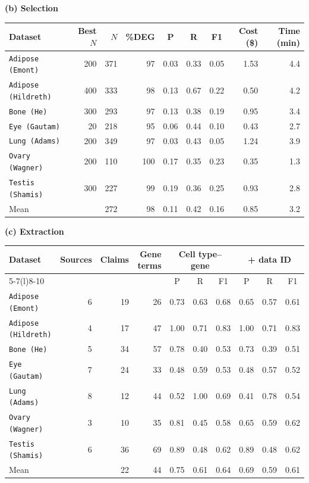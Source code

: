 \documentclass[10pt,twocolumn]{article}
\theoremstyle{plain}
\theoremstyle{definition}
\theoremstyle{remark}
\begin{document}
\begin{table}[ht!]
  \vspace{6pt}
  \textbf{(b) Selection}
  \vspace{2pt}

  \begin{tabular}{@{}l r r r ccc r r@{}}
  \toprule
  Dataset & Best $N$ & $N$ & \%DEG & P & R & F1 & Cost (\$) & Time (min) \\
  \midrule
  \texttt{Adipose (Emont)}    & 200 & 371 &  97 & 0.03 & 0.33 & 0.05 & 1.53 &  4.4 \\
  \texttt{Adipose (Hildreth)} & 400 & 333 &  98 & 0.13 & 0.67 & 0.22 & 0.50 &  4.2 \\
  \texttt{Bone (He)}          & 300 & 293 &  97 & 0.13 & 0.38 & 0.19 & 0.95 &  3.4 \\
  \texttt{Eye (Gautam)}       &  20 & 218 &  95 & 0.06 & 0.44 & 0.10 & 0.43 &  2.7 \\
  \texttt{Lung (Adams)}       & 200 & 349 &  97 & 0.03 & 0.43 & 0.05 & 1.24 &  3.9 \\
  \texttt{Ovary (Wagner)}     & 200 & 110 & 100 & 0.17 & 0.35 & 0.23 & 0.35 &  1.3 \\
  \texttt{Testis (Shamis)}    & 300 & 227 &  99 & 0.19 & 0.36 & 0.25 & 0.93 &  2.8 \\
  \midrule
  Mean               &     & 272 &  98 & 0.11 & 0.42 & 0.16 & 0.85 &  3.2 \\
  \bottomrule
  \end{tabular}

  \vspace{6pt}
  \textbf{(c) Extraction}
  \vspace{2pt}

  \begin{tabular}{@{}l r r r ccc ccc@{}}
  \toprule
  Dataset & Sources & Claims & Gene terms & \multicolumn{3}{c}{Cell type--gene} & \multicolumn{3}{c}{+ data ID} \\
  \cmidrule(lr){5-7}\cmidrule(l){8-10}
  & & & & P & R & F1 & P & R & F1 \\
  \midrule
  \texttt{Adipose (Emont)}    & 6 & 19 & 26 & 0.73 & 0.63 & 0.68 & 0.65 & 0.57 & 0.61 \\
  \texttt{Adipose (Hildreth)} & 4 & 17 & 47 & 1.00 & 0.71 & 0.83 & 1.00 & 0.71 & 0.83 \\
  \texttt{Bone (He)}          & 5 & 34 & 57 & 0.78 & 0.40 & 0.53 & 0.73 & 0.39 & 0.51 \\
  \texttt{Eye (Gautam)}       & 7 & 24 & 33 & 0.48 & 0.59 & 0.53 & 0.48 & 0.57 & 0.52 \\
  \texttt{Lung (Adams)}       & 8 & 12 & 44 & 0.52 & 1.00 & 0.69 & 0.41 & 0.78 & 0.54 \\
  \texttt{Ovary (Wagner)}     & 3 & 10 & 35 & 0.81 & 0.45 & 0.58 & 0.65 & 0.59 & 0.62 \\
  \texttt{Testis (Shamis)}    & 6 & 36 & 69 & 0.89 & 0.48 & 0.62 & 0.89 & 0.48 & 0.62 \\
  \midrule
  Mean                         &   & 22 & 44 & 0.75 & 0.61 & 0.64 & 0.69 & 0.59 & 0.61 \\
  \bottomrule
  \end{tabular}
\end{table}
\end{document}

